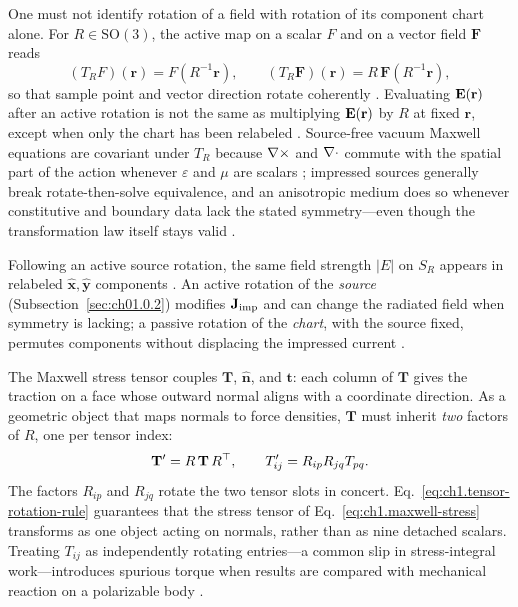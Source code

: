 One must not identify rotation of a field with rotation of its component chart alone. For $R\in\mathrm{SO}(3)$, the active map on a scalar $F$ and on a vector field $\mathbf{F}$ reads
\begin{equation}
\label{eq:ch1.field-rotation-operator}
(T_R F)(\mathbf{r})=F(R^{-1}\mathbf{r}),
\qquad
(T_R\mathbf{F})(\mathbf{r})=R\,\mathbf{F}(R^{-1}\mathbf{r}),
\end{equation}
so that sample point and vector direction rotate coherently \cite{jackson1999}. Evaluating $\mathbf{E}(\mathbf{r})$ after an active rotation is not the same as multiplying $\mathbf{E}(\mathbf{r})$ by $R$ at fixed $\mathbf{r}$, except when only the chart has been relabeled \cite{stratton1941}. Source-free vacuum Maxwell equations are covariant under $T_R$ because $\nabla\times$ and $\nabla\cdot$ commute with the spatial part of the action whenever $\varepsilon$ and $\mu$ are scalars \cite{maxwell1873}; impressed sources generally break rotate-then-solve equivalence, and an anisotropic medium does so whenever constitutive and boundary data lack the stated symmetry---even though the transformation law itself stays valid \cite{stratton1941}.

Following an active source rotation, the same field strength $|E|$ on $S_R$ appears in relabeled $\hat{\mathbf{x}},\hat{\mathbf{y}}$ components \cite{hansen1988}. An active rotation of the \emph{source} (Subsection~\ref{sec:ch01.0.2}) modifies $\mathbf{J}_{\mathrm{imp}}$ and can change the radiated field when symmetry is lacking; a passive rotation of the \emph{chart}, with the source fixed, permutes components without displacing the impressed current \cite{stratton1941}.

The Maxwell stress tensor couples $\mathbf{T}$, $\hat{\mathbf{n}}$, and $\mathbf{t}$: each column of $\mathbf{T}$ gives the traction on a face whose outward normal aligns with a coordinate direction. As a geometric object that maps normals to force densities, $\mathbf{T}$ must inherit \emph{two} factors of $R$, one per tensor index:
\begin{equation}
\label{eq:ch1.tensor-rotation-rule}
\mathbf{T}' = R\,\mathbf{T}\,R^\top,
\qquad
T'_{ij}=R_{ip}R_{jq}T_{pq}.
\end{equation}
The factors $R_{ip}$ and $R_{jq}$ rotate the two tensor slots in concert. Eq.~\eqref{eq:ch1.tensor-rotation-rule} guarantees that the stress tensor of Eq.~\eqref{eq:ch1.maxwell-stress} transforms as one object acting on normals, rather than as nine detached scalars.
Treating $T_{ij}$ as independently rotating entries---a common slip in stress-integral work---introduces spurious torque when results are compared with mechanical reaction on a polarizable body \cite{beth1936}.

